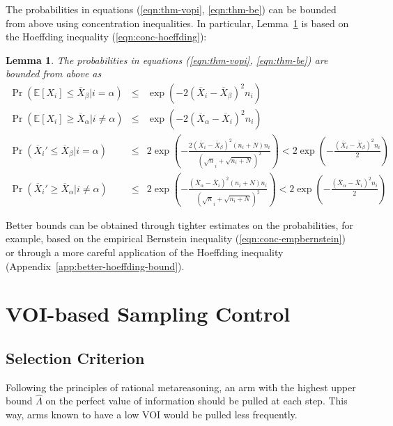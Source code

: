 \documentclass{article}
\newcommand {\IE} {\ensuremath {\mathbb{E}}}
\newtheorem{lmm}{Lemma}
\begin{document}
 The probabilities in equations (\ref{eqn:thm-vopi}, \ref{eqn:thm-be}) can be bounded from above using concentration
inequalities. In particular, Lemma~\ref{lemma:hoeffding-prob-bounds} is
based on the Hoeffding inequality (\ref{eqn:conc-hoeffding}):
\begin{lmm} The probabilities in equations (\ref{eqn:thm-vopi}, \ref{eqn:thm-be}) are bounded from above as
\begin{eqnarray}
\Pr(\IE[X_i] \le \overline X_\beta|i=\alpha)& \le & \exp(-2 (\overline X_i - \overline X_\beta)^2 n_i)\nonumber\\
\Pr(\IE[X_i] \ge \overline X_\alpha|i\ne\alpha)& \le & \exp(-2 (\overline X_\alpha - \overline X_i)^2 n_i)\nonumber\\
\Pr(\overline X_i' \le \overline X_\beta|i=\alpha)& \le &  2\exp\left(-\frac {2(\overline X_i - \overline X_\beta)^2  (n_i+N) n_i} {(\sqrt n_i + \sqrt {n_i + N})^2}  \right) < 2\exp\left(-\frac {(\overline X_i - \overline X_\beta)^2 n_i} 2 \right)\nonumber\\
\Pr(\overline X_i' \ge \overline X_\alpha|i\ne\alpha)& \le & 2\exp\left(-\frac {(\overline X_\alpha - \overline X_i)^2 (n_i+N) n_i} {(\sqrt n_i + \sqrt {n_i + N})^2} \right) <  2\exp\left(-\frac {(\overline X_\alpha - \overline X_i)^2 n_i} 2 \right)
\label{eqn:probound-perf-hoeffding}
\end{eqnarray}
\label{lemma:hoeffding-prob-bounds}
\end{lmm}

Better bounds can be obtained through tighter estimates on
the probabilities, for example, based on the empirical Bernstein
inequality (\ref{eqn:conc-empbernstein}) or through a more careful
application of the Hoeffding inequality (Appendix~\ref{app:better-hoeffding-bound}).

\section{VOI-based Sampling Control}

\subsection{Selection Criterion}

Following the principles of rational metareasoning, an arm with the highest upper bound $\hat
\Lambda$ on the perfect value of information should be pulled at each
step. This way, arms known to have a low VOI  would be pulled less frequently.
\end{document}
